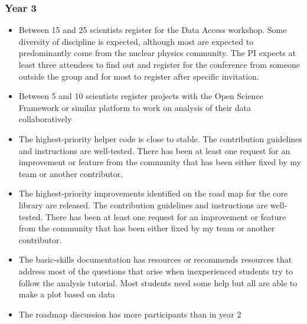 \documentclass[11pt,oneside]{memoir}
\begin{document}
\subsubsection*{Year 3}
\begin{itemize}
  \item Between 15 and 25 scientists register for the Data Access workshop.  Some diversity of discipline is expected, although most are expected to predominantly come from the nuclear physics community.  The PI expects at least three attendees to find out and register for the conference from someone outside the group and for most to register after specific invitation.
  \item Between 5 and 10 scientists register projects with the Open Science Framework or similar platform to work on analysis of their data collaboratively
  \item The highest-priority helper code is close to stable.  The contribution guidelines and instructions are well-tested.  There has been at least one request for an improvement or feature from the community that has been either fixed by my team or another contributor.
  \item The highest-priority improvements identified on the road map for the core library are released.  The contribution guidelines and instructions are well-tested.  There has been at least one request for an improvement or feature from the community that has been either fixed by my team or another contributor.
  \item The basic-skills documentation has resources or recommends resources that address most of the questions that arise when inexperienced students try to follow the analysis tutorial.  Most students need some help but all are able to make a plot based on data
  \item The roadmap discussion has more participants than in year 2
\end{itemize}
\end{document}
